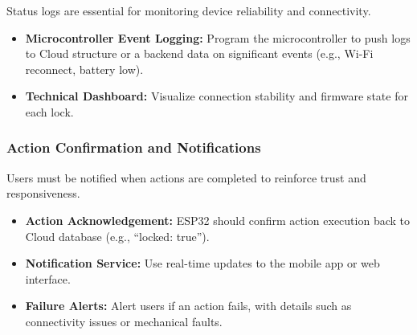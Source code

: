 Status logs are essential for monitoring device reliability and connectivity.

\begin{itemize}
  \item \textbf{Microcontroller Event Logging:} Program the microcontroller to push logs to Cloud structure or a backend data on significant events (e.g., Wi-Fi reconnect, battery low).
  \item \textbf{Technical Dashboard:} Visualize connection stability and firmware state for each lock.
\end{itemize}

\subsubsection*{Action Confirmation and Notifications}

Users must be notified when actions are completed to reinforce trust and responsiveness.

\begin{itemize}
  \item \textbf{Action Acknowledgement:} ESP32 should confirm action execution back to Cloud database (e.g., “locked: true”).
  \item \textbf{Notification Service:} Use real-time updates to the mobile app or web interface.
  \item \textbf{Failure Alerts:} Alert users if an action fails, with details such as connectivity issues or mechanical faults.
\end{itemize}
